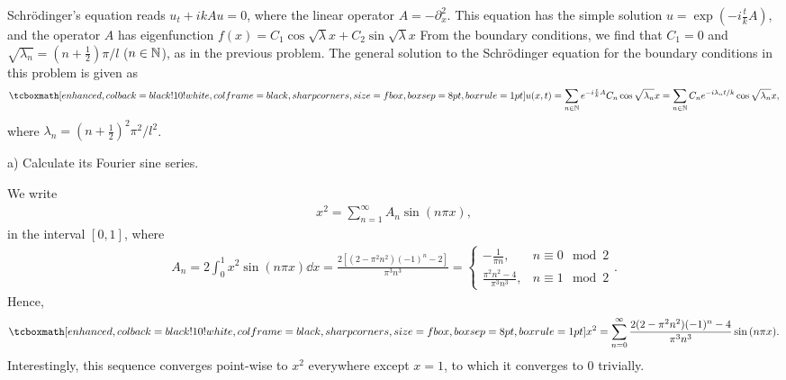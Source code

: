 
Schr\"{o}dinger's equation reads $u_{t} + ikAu = 0$, where the linear operator $A = -\partial^2_{x}$.
This equation has the simple solution $u = \exp(-i\frac{t}{k}A)$, and the operator $A$ has eigenfunction $f(x) = C_{1} \cos{\sqrt{\lambda} x} + C_{2} \sin{\sqrt{\lambda} x}$
From the boundary conditions, we find that $C_{1} = 0$ and $\sqrt{\lambda_{n}} = (n+\frac{1}{2})\pi/l$ ($n \in \mathbb{N}$), as in the previous problem.
The general solution to the Schr\"{o}dinger equation for the boundary conditions in this problem is given as
\begin{eqnarray}
    \label{eq:solution-Schrodinger}
    \eqbox{
    u(x,t) = \sum_{n \in \naturals} e^{-i\frac{t}{k}A} C_{n}\cos{\sqrt{\lambda_{n}}x} = \sum_{n \in \naturals} C_{n} e^{-i\lambda_{n}t/k} \cos{\sqrt{\lambda_{n}} x}
}
,\end{eqnarray}
where $\lambda_{n} = (n+\frac{1}{2})^2\pi^2/l^2$.


a) Calculate its Fourier sine series.

We write
\begin{eqnarray}
    \label{eq:sine-series}
    x^2 = \sum_{n=1}^{\infty} A_{n} \sin{(n\pi x)} 
,\end{eqnarray}
in the interval $[0,1]$, where
\begin{eqnarray}
    \label{eq:coeff-sine}
    A_{n} = 2 \int_{0}^{1} x^2 \sin{(n \pi x)} \dd{x} = \frac{2[(2 - \pi^2n^2)(-1)^{n} - 2]}{\pi^3 n^3} = 
    \begin{cases}
        -\frac{1}{\pi n}, & n \equiv 0 \mod{2} \\
        \frac{\pi^2n^2 - 4}{\pi^3 n^3}, & n \equiv 1 \mod{2}
    \end{cases}
.\end{eqnarray}
Hence,
\begin{align}
    \label{eq:sine-series-with-coeff}
    \eqbox{
    x^2 = \sum_{n=0}^{\infty} \frac{2(2-\pi^2n^2)(-1)^{n} - 4}{\pi^3n^3} \sin{(n\pi x)}
}
.\end{align}
Interestingly, this sequence converges point-wise to $x^2$ everywhere except $x=1$, to which it converges to $0$ trivially.

